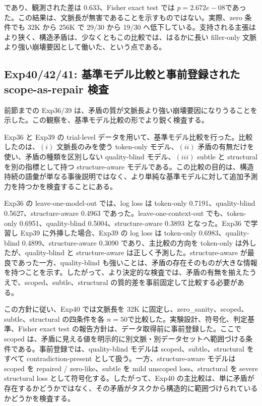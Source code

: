 \documentclass[12pt,a4paper]{article}
\begin{document}
であり、観測された差は 0.633、Fisher exact test では \(p = 2.672e-08\)であった。この結果は、文脈長が無害であることを示すものではない。実際、zero 条件でも 32K から 256K で 29/30 から 19/30 へ低下している。支持される主張はより狭く、構造矛盾は、少なくともこの比較では、はるかに長い filler-only 文脈より強い崩壊要因として働いた、という点である。

\subsection{Exp40/42/41: 基準モデル比較と事前登録された scope-as-repair 検査}\label{exp404241-ux57faux6e96ux30e2ux30c7ux30ebux6bd4ux8f03ux3068ux4e8bux524dux767bux9332ux3055ux308cux305f-scope-as-repair-ux691cux67fb}

前節までの Exp36/39 は、矛盾の質が文脈長より強い崩壊要因になりうることを示した。この観察を、基準モデル比較の形でより鋭く検査する。

Exp36 と Exp39 の trial-level データを用いて、基準モデル比較を行った。比較したのは、\((i)\) 文脈長のみを使う token-only モデル、\((ii)\) 矛盾の有無だけを使い、矛盾の種類を区別しない quality-blind モデル、\((iii)\) subtle と structural を別の指標として持つ structure-aware モデルである。この比較の目的は、構造持続の語彙が単なる事後説明ではなく、より単純な基準モデルに対して追加予測力を持つかを検査することにある。

Exp36 の leave-one-model-out では、log loss は token-only 0.7191、quality-blind 0.5627、structure-aware 0.4963 であった。leave-one-context-out でも、token-only 0.6951、quality-blind 0.5004、structure-aware 0.3893 となった。Exp36 で学習し Exp39 に外挿した場合、Exp39 の log loss は token-only 0.6983、quality-blind 0.4899、structure-aware 0.3090 であり、主比較の方向を token-only は外したが、quality-blind と structure-aware は正しく予測した。structure-aware が最良であった一方、quality-blind も強いことは、矛盾の存在そのものが大きな情報を持つことを示す。したがって、より決定的な検査では、矛盾の有無を揃えたうえで、scoped、subtle、structural の質的差を事前固定して比較する必要がある。

この方針に従い、Exp40 では文脈長を 32K に固定し、zero\_sanity、scoped、subtle、structural の四条件を各 \(n=50\)で比較した。実験設計、符号化、判定基準、Fisher exact test の報告方針は、データ取得前に事前登録した。ここで scoped は、矛盾に見える値を明示的に別文脈・別データセットへ範囲づける条件である。事前登録では、quality-blind モデルは scoped、subtle、structural をすべて contradiction-present として扱う。一方、structure-aware モデルは scoped を repaired / zero-like、subtle を mild unscoped loss、structural を severe structural loss として符号化する。したがって、Exp40 の主比較は、単に矛盾が存在するかどうかではなく、その矛盾がタスクから構造的に範囲づけられているかどうかを検査する。
\end{document}
